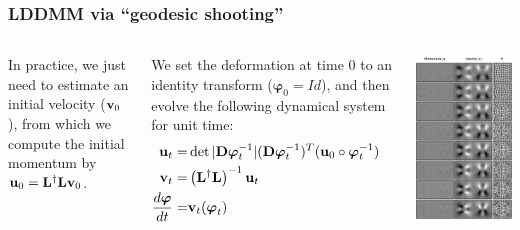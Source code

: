 \begin{frame}
\frametitle{LDDMM via ``geodesic shooting''}
\begin{columns}[c]
In practice, we just need to estimate an initial velocity (${\bf v}_0$), from which we compute the initial momentum by ${\bf u}_0 = {\bf L}^{\dagger}{\bf L}{\bf v}_0$.

We set the deformation at time 0 to an identity transform (${\boldsymbol\varphi}_0 = Id$), and then evolve the following dynamical system for unit time:
\begin{eqnarray*}
{\bf u}_{t} = & \det |{\bf D}{\boldsymbol\varphi}_{t}^{-1}| ({\bf D}{\boldsymbol\varphi}_{t}^{-1})^T ({\bf u}_{0} \circ {\boldsymbol\varphi}_{t}^{-1})\cr
{\bf v}_{t} = & \left({\bf L}^{\dagger}{\bf L}\right)^{-1} {\bf u}_t\cr
\frac{d {\boldsymbol\varphi}}{d t} = & {\bf v}_t ({\boldsymbol\varphi}_t)
\end{eqnarray*}
\begin{center}
\includegraphics[width=1\textwidth]{evolution1}

\end{center}
\end{columns}
\end{frame}
